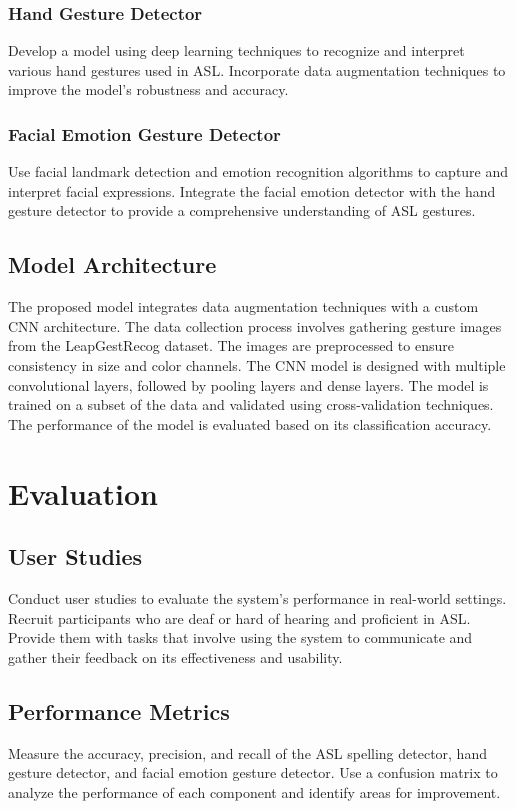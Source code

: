 \documentclass{article}
\begin{document}
\subsubsection{Hand Gesture Detector}
Develop a model using deep learning techniques to recognize and interpret various hand gestures used in ASL. Incorporate data augmentation techniques to improve the model's robustness and accuracy.

\subsubsection{Facial Emotion Gesture Detector}
Use facial landmark detection and emotion recognition algorithms to capture and interpret facial expressions. Integrate the facial emotion detector with the hand gesture detector to provide a comprehensive understanding of ASL gestures.

\subsection{Model Architecture}
The proposed model integrates data augmentation techniques with a custom CNN architecture. The data collection process involves gathering gesture images from the LeapGestRecog dataset. The images are preprocessed to ensure consistency in size and color channels. The CNN model is designed with multiple convolutional layers, followed by pooling layers and dense layers. The model is trained on a subset of the data and validated using cross-validation techniques. The performance of the model is evaluated based on its classification accuracy.


\section{Evaluation}
\subsection{User Studies}
Conduct user studies to evaluate the system's performance in real-world settings. Recruit participants who are deaf or hard of hearing and proficient in ASL. Provide them with tasks that involve using the system to communicate and gather their feedback on its effectiveness and usability.

\subsection{Performance Metrics}
Measure the accuracy, precision, and recall of the ASL spelling detector, hand gesture detector, and facial emotion gesture detector. Use a confusion matrix to analyze the performance of each component and identify areas for improvement.
\end{document}
